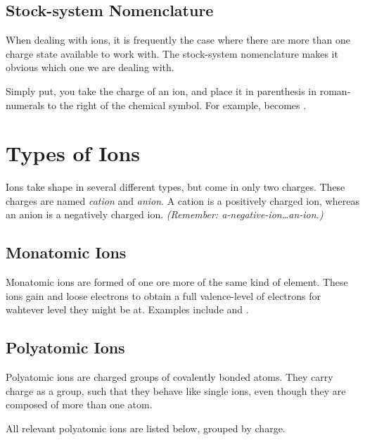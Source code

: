\subsection{Stock-system Nomenclature}
When dealing with ions, it is frequently the case where there are more than one
charge state available to work with.  The stock-system nomenclature makes it
obvious which one we are dealing with.

Simply put, you take the charge of an ion, and place it in parenthesis in
roman-numerals to the right of the chemical symbol.  For example, 
becomes .

\section{Types of Ions}
Ions take shape in several different types, but come in only two charges.  These
charges are named \textit{cation} and \textit{anion}.  A cation is a positively
charged ion, whereas an anion is a negatively charged ion.  \textit{(Remember:
a-negative-ion\dots an-ion.)}

\subsection{Monatomic Ions}
Monatomic ions are formed of one ore more of the same kind of element.  These
ions gain and loose electrons to obtain a full valence-level of electrons for
wahtever level they might be at.  Examples include  and .

\subsection{Polyatomic Ions}
Polyatomic ions are charged groups of covalently bonded atoms.  They carry
charge as a group, such that they behave like single ions, even though they are
composed of more than one atom.

All relevant polyatomic ions are listed below, grouped by charge.

